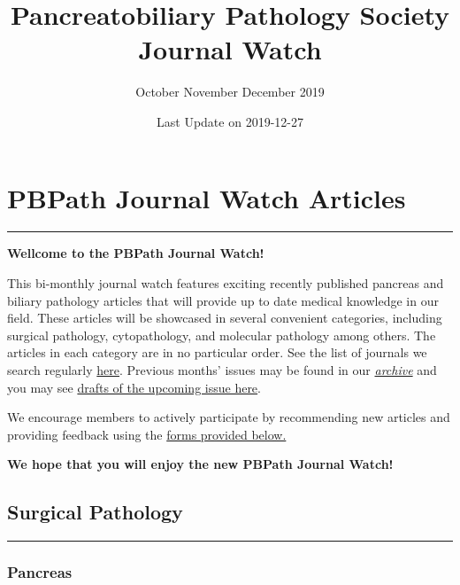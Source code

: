 \documentclass[
]{article}
\title{Pancreatobiliary Pathology Society Journal Watch}
\subtitle{October November December 2019}
\author{}
\date{\vspace{-2.5em}Last Update on 2019-12-27}
\renewcommand{\linethickness}{0.05em}
\begin{document}
\maketitle

{
\setcounter{tocdepth}{5}
\tableofcontents
}
\pagebreak

\hypertarget{pbpath_jw}{%
\section{PBPath Journal Watch Articles}\label{pbpath_jw}}

\begin{center}\rule{0.5\linewidth}{\linethickness}\end{center}

\textbf{Wellcome to the PBPath Journal Watch!}

This bi-monthly journal watch features exciting recently published
pancreas and biliary pathology articles that will provide up to date
medical knowledge in our field. These articles will be showcased in
several convenient categories, including surgical pathology,
cytopathology, and molecular pathology among others. The articles in
each category are in no particular order. See the list of journals we
search regularly \href{http://pbpath.org/pbpath-journal-watch/}{here}.
Previous months' issues may be found in our
\emph{\href{http://pbpath.org/journal-watch-archive/}{archive}} and you
may see \href{http://pbpath.org/journal-watch-upcoming-issue/}{drafts of
the upcoming issue here}.

We encourage members to actively participate by recommending new
articles and providing feedback using the
\protect\hyperlink{feedback}{forms provided below.}

\textbf{We hope that you will enjoy the new PBPath Journal Watch!}

\pagebreak

\hypertarget{surgical_pathology}{%
\subsection{Surgical Pathology}\label{surgical_pathology}}

\begin{center}\rule{0.5\linewidth}{\linethickness}\end{center}

\hypertarget{pancreas}{%
\subsubsection{Pancreas}\label{pancreas}}
\end{document}
